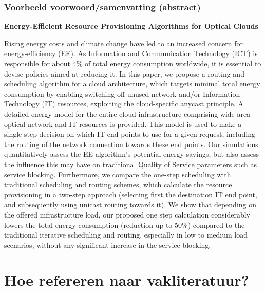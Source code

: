 \documentclass{beamer}
\begin{document}
\begin{frame}
  \frametitle{Voorbeeld voorwoord/samenvatting (abstract)}

  \begin{center}
  \end{center}

  \scriptsize
  \textbf{Energy-Efficient Resource Provisioning Algorithms for Optical Clouds}

  \alert<1>{Rising energy costs and climate change have led to an increased concern for energy-efficiency (EE).} \alert<2>{As Information and Communication Technology (ICT) is responsible for about 4\% of total energy consumption worldwide, it is essential to devise policies aimed at reducing it.} \alert<3>{In this paper, we propose a routing and scheduling algorithm for a cloud architecture, which targets minimal total energy consumption by enabling switching off unused network and/or Information Technology (IT) resources, exploiting the cloud-specific anycast principle.} \alert<4>{A detailed energy model for the entire cloud infrastructure comprising wide area optical network and IT resources is provided. This model is used to make a single-step decision on which IT end points to use for a given request, including the routing of the network connection towards these end points. Our simulations quantitatively assess the EE algorithm’s potential energy savings, but also assess the influence this may have on traditional Quality of Service parameters such as service blocking. Furthermore, we compare the one-step scheduling with traditional scheduling and routing schemes, which calculate the resource provisioning in a two-step approach (selecting first the destination IT end point, and subsequently using unicast routing towards it).} \alert<5>{We show that depending on the offered infrastructure load, our proposed one step calculation considerably lowers the total energy consumption (reduction up to 50\%) compared to the traditional iterative scheduling and routing, especially in low to medium load scenarios, without any significant increase in the service blocking.}

\end{frame}



\section{Hoe refereren naar vakliteratuur?}
\end{document}
